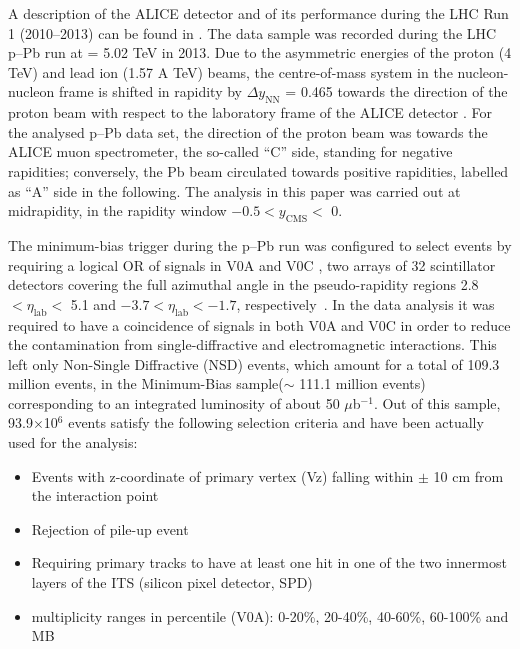 A description of the ALICE detector and of its performance during the LHC Run 1 (2010--2013)
can be found in \cite{cite:ALICE, cite:ALICEPerformance}. The data sample was recorded during the LHC p--Pb run at \snn = 5.02 TeV in 2013. Due to the asymmetric energies of the proton (4 TeV) and lead ion (1.57 A TeV) beams, the centre-of-mass system in the nucleon-nucleon frame is shifted in rapidity by $\Delta y_{\mathrm{NN}}$ = 0.465 towards the 
direction of the proton beam with respect to the laboratory frame of the ALICE detector \cite{cite:KphipPb}. 
For the analysed p--Pb data set, the direction of the proton beam was towards the ALICE muon spectrometer,
the so-called ``C'' side, standing for negative rapidities; conversely, the Pb beam circulated towards 
positive rapidities, labelled as ``A'' side in the following. The analysis in this paper was carried out at midrapidity, 
in the rapidity window $-0.5 < y_{\mathrm{CMS}} <$ 0.

The minimum-bias trigger during the p--Pb run was configured to select events by requiring a logical OR 
of signals in V0A and V0C \cite{cite:ALICEPerformance}, two arrays of 32 scintillator detectors 
covering the full azimuthal angle in the pseudo-rapidity regions 2.8 $< \eta_{\mathrm{lab}} <$ 5.1 and 
$-3.7 < \eta_{\mathrm{lab}} < -1.7$, respectively~\cite{cite:rapidity}. In the data analysis it was required to 
have a coincidence of signals in both V0A and V0C in order to reduce the contamination 
from single-diffractive and electromagnetic interactions. This left only Non-Single Diffractive (NSD) events, 
which amount for a total of 109.3 million events, in the Minimum-Bias sample($\sim$ 111.1 million events) corresponding 
to an integrated luminosity of about 50 $\mu$b$^{-1}$. Out of this sample, 93.9$\times$10$^{6}$ events satisfy the following selection criteria and have been actually used for the analysis:

\begin{itemize}
\item Events with z-coordinate of primary vertex (Vz) falling within $\pm$ 10 cm from the interaction point  
\item Rejection of pile-up event 
\item Requiring primary tracks to have at least one hit in one of the two innermost layers of the ITS (silicon pixel detector, SPD) 
\item multiplicity ranges in percentile (V0A): 0-20\%, 20-40\%, 40-60\%, 60-100\% and MB 
\end{itemize}

